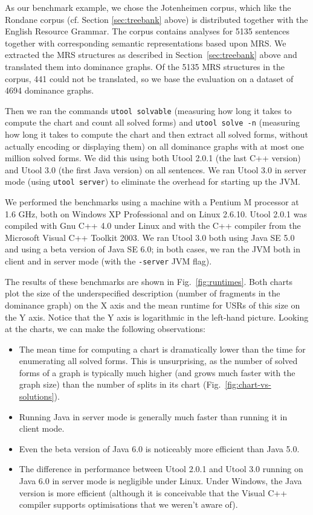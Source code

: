 As our benchmark example, we chose the Jotenheimen corpus, which like
the Rondane corpus (cf. Section \ref{sec:treebank} above) is
distributed together with the English Resource Grammar. The corpus
contains analyses for 5135 sentences together with corresponding
semantic representations based upon MRS. We extracted the MRS
structures as described in Section~\ref{sec:treebank} above and
translated them into dominance graphs. Of the 5135 MRS structures in
the corpus, 441 could not be translated, so we base the evaluation on
a dataset of 4694 dominance graphs.

Then we ran the commands
\verb?utool solvable? (measuring how long it takes to compute the
chart and count all solved forms) and \verb?utool solve -n? (measuring
how long it takes to compute the chart and then extract all solved
forms, without actually encoding or displaying them) on all dominance graphs with at most one million solved forms. We did this
using both Utool 2.0.1 (the last C++ version) and Utool 3.0 (the first
Java version) on all sentences. We ran Utool 3.0 in server mode (using
\verb?utool server?) to eliminate the overhead for starting up the
JVM.

We performed the benchmarks using a machine with a Pentium M processor
at 1.6 GHz, both on Windows XP Professional and on Linux 2.6.10. Utool
2.0.1 was compiled with Gnu C++ 4.0 under Linux and with the C++
compiler from the Microsoft Visual C++ Toolkit 2003. We ran Utool 3.0
both using Java SE 5.0 and using a beta version of Java SE 6.0; in
both cases, we ran the JVM both in client and in server mode (with the
\verb?-server? JVM flag).

The results of these benchmarks are shown in
Fig.~\ref{fig:runtimes}. Both charts plot the size of the
underspecified description (number of fragments in the dominance
graph) on the X axis and the mean runtime for USRs of this size on the
Y axis. Notice that the Y axis is logarithmic in the left-hand picture.
Looking at the
charts, we can make the following observations:
\begin{itemize}
\item The mean time for computing a chart is dramatically lower than
the time for enumerating all solved forms. This is unsurprising, as
the number of solved forms of a graph is typically much higher (and
grows much faster with the graph size) than the number of splits in
its chart (Fig.~\ref{fig:chart-vs-solutions}).
\item Running Java in server mode is generally much faster than
running it in client mode.
\item Even the beta version of Java 6.0 is noticeably more efficient
than Java 5.0.
\item The difference in performance between Utool 2.0.1 and Utool 3.0
running on Java 6.0 in server mode is negligible under Linux. Under
Windows, the Java version is more efficient (although it is
conceivable that the Visual C++ compiler supports optimisations that
we weren't aware of).
\end{itemize}



